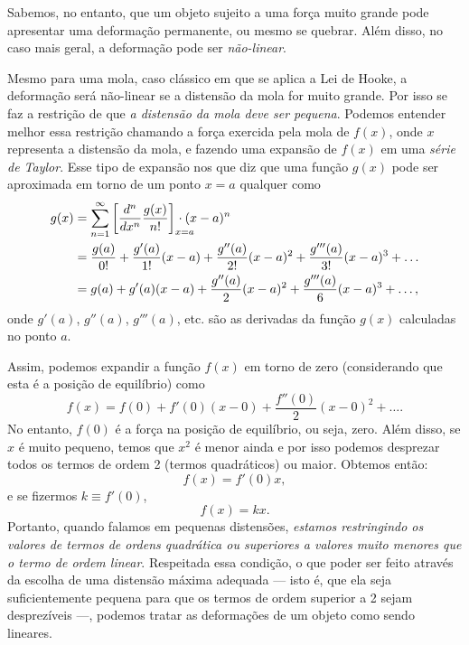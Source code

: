 \noindent{}Sabemos, no entanto, que um objeto sujeito a uma força muito grande pode apresentar uma deformação permanente, ou mesmo se quebrar. Além disso, no caso mais geral, a deformação pode ser \emph{não-linear}.

Mesmo para uma mola, caso clássico em que se aplica a Lei de Hooke, a deformação será não-linear se a distensão da mola for muito grande. Por isso se faz a restrição de que \emph{a distensão da mola deve ser pequena}. Podemos entender melhor essa restrição chamando a força exercida pela mola de $f(x)$, onde $x$ representa a distensão da mola, e fazendo uma expansão de $f(x)$ em uma \emph{série de Taylor}. Esse tipo de expansão nos que diz que uma função $g(x)$ pode ser aproximada em torno de um ponto $x=a$ qualquer como
\begin{align}
	g(x) &= \sum_{n=1}^\infty \left[\frac{d^n}{dx^n}\frac{g(x)}{n!}\right]_{\mathrlap{x=a}}\cdot (x-a)^n \\
	&= \frac{g(a)}{0!} + \frac{g'(a)}{1!}(x - a) + \frac{g''(a)}{2!}(x-a)^2 + \frac{g'''(a)}{3!}(x-a)^3 + \dots \\
	&= g(a) + g'(a)(x-a) + \frac{g''(a)}{2}(x-a)^2 + \frac{g'''(a)}{6}(x-a)^3 + \dots,
\end{align}
%
onde $g'(a)$, $g''(a)$, $g'''(a)$, etc. são as derivadas da função $g(x)$ calculadas no ponto $a$.

Assim, podemos expandir a função $f(x)$ em torno de zero (considerando que esta é a posição de equilíbrio) como
\begin{equation}
	f(x) = f(0) + f'(0) (x-0) + \frac{f''(0)}{2}(x-0)^2 + \dots.
\end{equation}
%
No entanto, $f(0)$ é a força na posição de equilíbrio, ou seja, zero. Além disso, se $x$ é muito pequeno, temos que $x^2$ é menor ainda e por isso podemos desprezar todos os termos de ordem 2 (termos quadráticos) ou maior. Obtemos então:
\begin{equation}
	f(x) = f'(0)x,
\end{equation}
%
e se fizermos $k \equiv f'(0)$,
\begin{equation}
	f(x) = kx.
\end{equation}
%
Portanto, quando falamos em pequenas distensões, \emph{estamos restringindo os valores de termos de ordens quadrática ou superiores a valores muito menores que o termo de ordem linear}. Respeitada essa condição, o que poder ser feito através da escolha de uma distensão máxima adequada --- isto é, que ela seja suficientemente pequena para que os termos de ordem superior a 2 sejam desprezíveis ---, podemos tratar as deformações de um objeto como sendo lineares.


